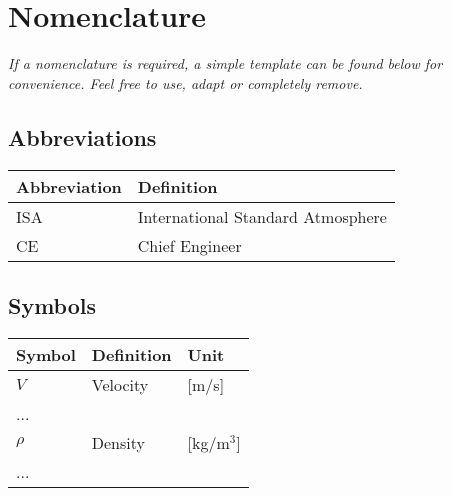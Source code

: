 \chapter*{Nomenclature}

\emph{If a nomenclature is required, a simple template can be found below for convenience. Feel free to use, adapt or completely remove.}

\section*{Abbreviations}

\begin{longtable}{p{2.5cm}p{8cm}}
    \toprule
    Abbreviation & Definition \\
    \midrule\endhead %
    ISA & International Standard Atmosphere \\
    CE & Chief Engineer \\
    \bottomrule
\end{longtable}

\section*{Symbols}

\begin{longtable}{p{2.5cm}p{8cm}p{2.5cm}}
    \toprule
    Symbol & Definition & Unit \\
    \midrule\endhead %
    $V$ & Velocity & [m/s] \\
    ... \\
    \midrule %
    $\rho$ & Density & [kg/m$^3$] \\
    ... \\
    \bottomrule
\end{longtable}
